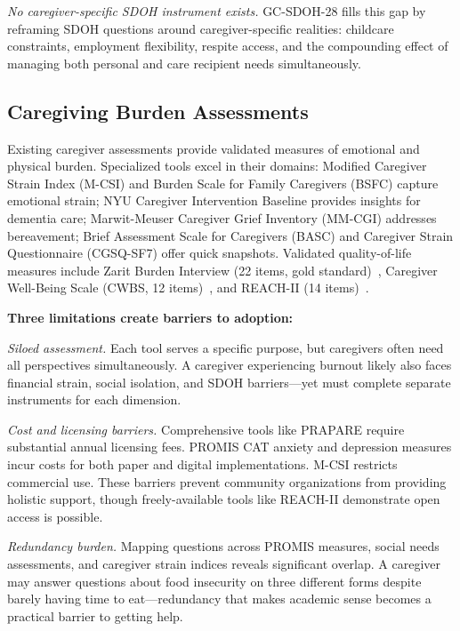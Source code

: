\documentclass{article}
\begin{document}
\textit{No caregiver-specific SDOH instrument exists.} GC-SDOH-28 fills this gap by reframing SDOH questions around caregiver-specific realities: childcare constraints, employment flexibility, respite access, and the compounding effect of managing both personal and care recipient needs simultaneously.

%
\subsection{Caregiving Burden Assessments}%
\label{subsec:CaregivingBurdenAssessments}%
Existing caregiver assessments provide validated measures of emotional and physical burden. Specialized tools excel in their domains: Modified Caregiver Strain Index (M-CSI) and Burden Scale for Family Caregivers (BSFC) capture emotional strain; NYU Caregiver Intervention Baseline provides insights for dementia care; Marwit-Meuser Caregiver Grief Inventory (MM-CGI) addresses bereavement; Brief Assessment Scale for Caregivers (BASC) and Caregiver Strain Questionnaire (CGSQ-SF7) offer quick snapshots. Validated quality-of-life measures include Zarit Burden Interview (22 items, gold standard)~\cite{zarit1980}, Caregiver Well-Being Scale (CWBS, 12 items)~\cite{tebb1995,tebb2013}, and REACH-II (14 items)~\cite{bella2006}.

\textbf{Three limitations create barriers to adoption:}

\textit{Siloed assessment.} Each tool serves a specific purpose, but caregivers often need all perspectives simultaneously. A caregiver experiencing burnout likely also faces financial strain, social isolation, and SDOH barriers—yet must complete separate instruments for each dimension.

\textit{Cost and licensing barriers.} Comprehensive tools like PRAPARE require substantial annual licensing fees. PROMIS CAT anxiety and depression measures incur costs for both paper and digital implementations. M-CSI restricts commercial use. These barriers prevent community organizations from providing holistic support, though freely-available tools like REACH-II demonstrate open access is possible.

\textit{Redundancy burden.} Mapping questions across PROMIS measures, social needs assessments, and caregiver strain indices reveals significant overlap. A caregiver may answer questions about food insecurity on three different forms despite barely having time to eat—redundancy that makes academic sense becomes a practical barrier to getting help.
\end{document}
